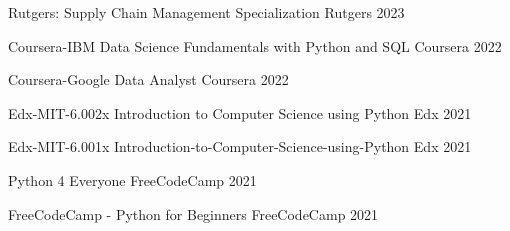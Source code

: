 \begin{cvhonors}
  \cvhonor
    {Rutgers: Supply Chain Management Specialization} %
    {Rutgers} %
    {} %
    {2023} %

  \cvhonor
    {Coursera-IBM Data Science Fundamentals with Python and SQL} %
    {Coursera} %
    {} %
    {2022} %

  \cvhonor
    {Coursera-Google Data Analyst} %
    {Coursera} %
    {} %
    {2022} %

  \cvhonor
    {Edx-MIT-6.002x Introduction to Computer Science using Python} %
    {Edx} %
    {} %
    {2021} %

  \cvhonor
    {Edx-MIT-6.001x Introduction-to-Computer-Science-using-Python} %
    {Edx} %
    {} %
    {2021} %

  \cvhonor
    {Python 4 Everyone} %
    {FreeCodeCamp} %
    {} %
    {2021} %

  \cvhonor
    {FreeCodeCamp - Python for Beginners} %
    {FreeCodeCamp} %
    {} %
    {2021} %

\end{cvhonors}